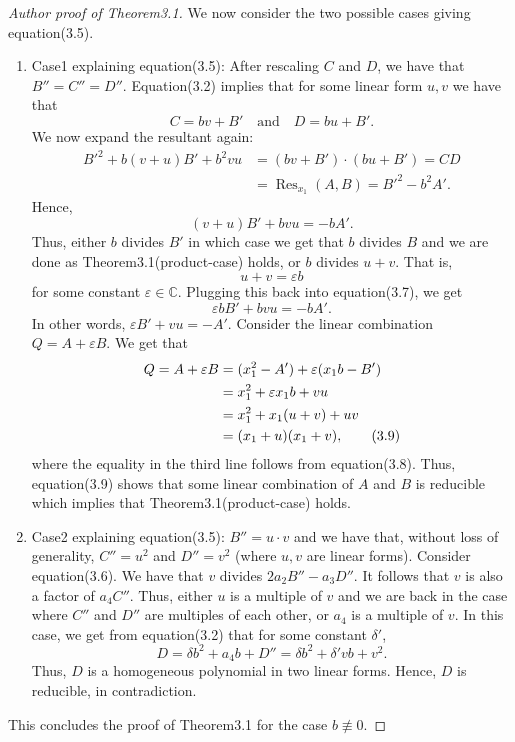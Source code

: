 \documentclass[10pt,a4paper]{article}
\begin{document}
\begin{proof}[Author proof of Theorem3.1]
We now consider the two possible cases giving equation(3.5).
\begin{enumerate}
\item Case1 explaining equation(3.5): After rescaling $C$ and $D$, we have that $B''=C''=D''$. Equation(3.2) implies that for some linear form $u,v$ we have that
\[C=bv+B'\quad\text{and}\quad D=bu+B'.\]
We now expand the resultant again:
\begin{align*}B'^2+b(v+u)B'+b^2vu&=(bv+B')\cdot(bu+B')=CD\\&=\operatorname{Res}_{x_1}(A,B)=B'^2-b^2A'.\end{align*}
Hence,
\begin{equation}(v+u)B'+bvu=-bA'.\tag{3.7}\end{equation}
Thus, either $b$ divides $B'$ in which case we get that $b$ divides $B$ and we are done as Theorem3.1(product-case) holds, or $b$ divides $u+v$. That is,
\begin{equation}u+v=\varepsilon b\tag{3.8}\end{equation}
for some constant $\varepsilon\in\mathbb C$. Plugging this back into equation(3.7), we get
\[\varepsilon bB'+bvu=-bA'.\]
In other words, $\varepsilon B'+vu=-A'$.
Consider the linear combination $Q=A+\varepsilon B$. We get that
\begin{align}Q=A+\varepsilon B&=(x_1^2-A')+\varepsilon(x_1b-B')\notag\\&=x_1^2+\varepsilon x_1b+vu\notag\\&=x_1^2+x_1(u+v)+uv\notag\\&=(x_1+u)(x_1+v),\tag{3.9}\end{align}
where the equality in the third line follows from equation(3.8). Thus, equation(3.9) shows that some linear combination of $A$ and $B$ is reducible which implies that Theorem3.1(product-case) holds.
\item Case2 explaining equation(3.5): $B''=u\cdot v$ and we have that, without loss of generality, $C''=u^2$ and $D''=v^2$ (where $u,v$ are linear forms). Consider equation(3.6). We have that $v$ divides $2a_2B''-a_3D''$. It follows that $v$ is also a factor of $a_4C''$. Thus, either $u$ is a multiple of $v$ and we are back in the case where $C''$ and $D''$ are multiples of each other, or $a_4$ is a multiple of $v$. In this case, we get from equation(3.2) that for some constant $\delta'$,
\[D=\delta b^2+a_4b+D''=\delta b^2+\delta'vb+v^2.\]
Thus, $D$ is a homogeneous polynomial in two linear forms. Hence, $D$ is reducible, in contradiction.
\end{enumerate}
This concludes the proof of Theorem3.1 for the case $b\not\equiv0$.

\end{proof}
\end{document}
